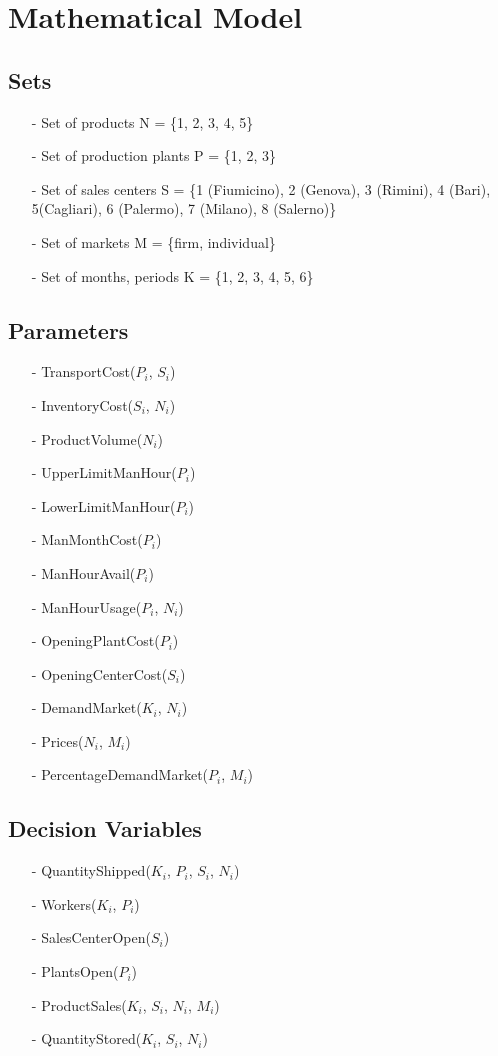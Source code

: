 \documentclass [a4paper,12pt,titlepage]{article}
\begin{document}
\section*{Mathematical Model}
\subsection{Sets}
\begin{enumerate}
    \item[-] Set of products N = \{1, 2, 3, 4, 5\}
    \item[-] Set of production plants P = \{1, 2, 3\}
    \item[-] Set of sales centers S = \{1 (Fiumicino), 2 (Genova), 3 (Rimini), 4 (Bari), 5(Cagliari), 6 (Palermo), 7 (Milano), 8 (Salerno)\}
    \item[-] Set of markets M = \{firm, individual\}
    \item[-] Set of months, periods K = \{1, 2, 3, 4, 5, 6\}
\end{enumerate}
\subsection{Parameters}
\begin{enumerate}
    \item[-] TransportCost($P_{i}$, $S_{i}$)
    \item[-] InventoryCost($S_{i}$, $N_{i}$)
    \item[-] ProductVolume($N_{i}$)
    \item[-] UpperLimitManHour($P_{i}$)
    \item[-] LowerLimitManHour($P_{i}$)
    \item[-] ManMonthCost($P_{i}$)
    \item[-] ManHourAvail($P_{i}$)
    \item[-] ManHourUsage($P_{i}$, $N_{i}$)
    \item[-] OpeningPlantCost($P_{i}$)
    \item[-] OpeningCenterCost($S_{i}$)
    \item[-] DemandMarket($K_{i}$, $N_{i}$)
    \item[-] Prices($N_{i}$, $M_{i}$)
    \item[-] PercentageDemandMarket($P_{i}$, $M_{i}$)
\end{enumerate}
\subsection{Decision Variables}
\begin{enumerate}
    \item[-] QuantityShipped($K_{i}$, $P_{i}$, $S_{i}$, $N_{i}$)
    \item[-] Workers($K_{i}$, $P_{i}$)
    \item[-] SalesCenterOpen($S_{i}$)
    \item[-] PlantsOpen($P_{i}$)
    \item[-] ProductSales($K_{i}$, $S_{i}$, $N_{i}$, $M_{i}$)
    \item[-] QuantityStored($K_{i}$, $S_{i}$, $N_{i}$)
\end{enumerate}
\end{document}
